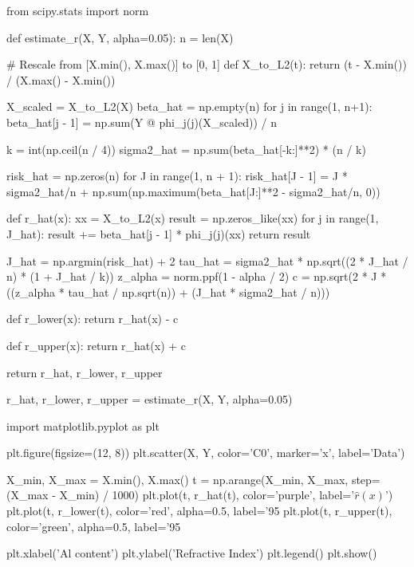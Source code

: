 \begin{python}
from scipy.stats import norm

def estimate_r(X, Y, alpha=0.05):
    n = len(X)

    # Rescale from [X.min(), X.max()] to [0, 1]
    def X_to_L2(t):
        return (t - X.min()) / (X.max() - X.min())
    
    X_scaled = X_to_L2(X)
    beta_hat = np.empty(n)
    for j in range(1, n+1):
        beta_hat[j - 1] = np.sum(Y @ phi_{j}(j)(X_scaled)) / n
        
    k = int(np.ceil(n / 4))
    sigma2_hat = np.sum(beta_hat[-k:]**2) * (n / k)

    risk_hat = np.zeros(n)
    for J in range(1, n + 1):
        risk_hat[J - 1] = J * sigma2_hat/n + np.sum(np.maximum(beta_hat[J:]**2 - sigma2_hat/n, 0))

    def r_hat(x):
        xx = X_to_L2(x)
        result = np.zeros_like(xx)
        for j in range(1, J_hat):
            result += beta_hat[j - 1] * phi_{j}(j)(xx)
        return result
        
    J_hat = np.argmin(risk_hat) + 2
    tau_hat = sigma2_hat * np.sqrt((2 * J_hat / n) * (1 + J_hat / k))
    z_alpha = norm.ppf(1 - alpha / 2)
    c = np.sqrt(2 * J * ((z_alpha * tau_hat / np.sqrt(n)) + (J_hat * sigma2_hat / n)))
    
    def r_lower(x):
        return r_hat(x) - c
    
    def r_upper(x):
        return r_hat(x) + c
            
    return r_hat, r_lower, r_upper
\end{python}

\begin{python}
r_hat, r_lower, r_upper = estimate_r(X, Y, alpha=0.05)
\end{python}

\begin{python}
import matplotlib.pyplot as plt

plt.figure(figsize=(12, 8))
plt.scatter(X, Y, color='C0', marker='x', label='Data')

X_min, X_max = X.min(), X.max()
t = np.arange(X_min, X_max, step=(X_max - X_min) / 1000)
plt.plot(t, r_hat(t), color='purple', label='$\hat{r}(x)$')
plt.plot(t, r_lower(t), color='red', alpha=0.5, label='95%
plt.plot(t, r_upper(t), color='green', alpha=0.5, label='95%

plt.xlabel('Al content')
plt.ylabel('Refractive Index')
plt.legend()
plt.show()
\end{python}

